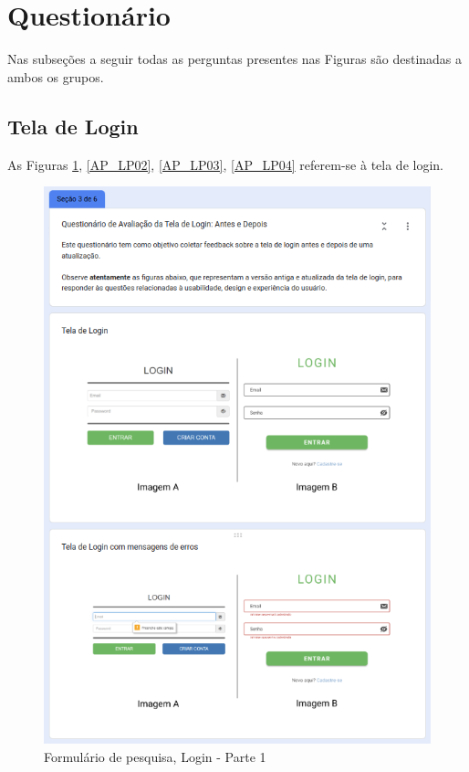 \section{Questionário}

Nas subseções a seguir todas as perguntas presentes nas Figuras são destinadas a ambos os grupos.

\subsection{Tela de Login}

As Figuras \ref{AP_LP01}, \ref{AP_LP02}, \ref{AP_LP03}, \ref{AP_LP04} referem-se à tela de login.

\begin{figure}[!h]
	\begin{center}
	    \includegraphics[scale=0.6]{figs/Form/05.png}
	\end{center}
	\caption{\label{AP_LP01}Formulário de pesquisa, Login - Parte 1}
\end{figure}


